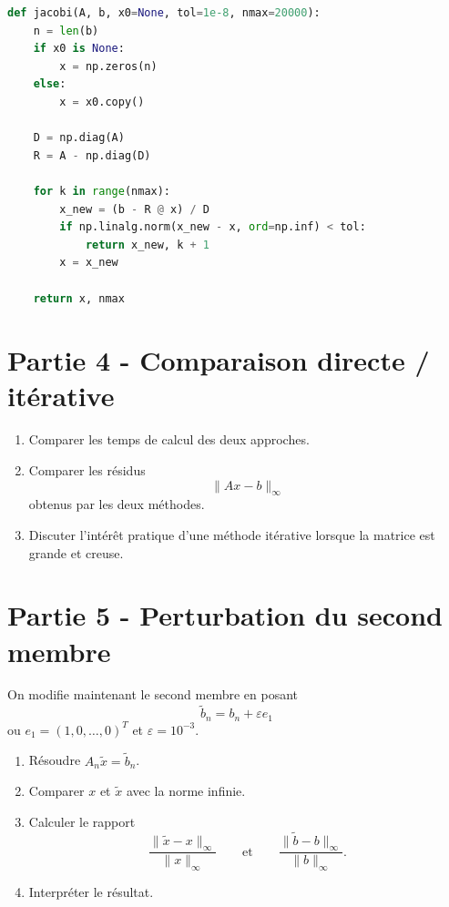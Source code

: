 \begin{lstlisting}[language=Python]
def jacobi(A, b, x0=None, tol=1e-8, nmax=20000):
    n = len(b)
    if x0 is None:
        x = np.zeros(n)
    else:
        x = x0.copy()

    D = np.diag(A)
    R = A - np.diag(D)

    for k in range(nmax):
        x_new = (b - R @ x) / D
        if np.linalg.norm(x_new - x, ord=np.inf) < tol:
            return x_new, k + 1
        x = x_new

    return x, nmax
\end{lstlisting}

\section*{Partie 4 - Comparaison directe / itérative}
\begin{enumerate}
    \item Comparer les temps de calcul des deux approches.

    \item Comparer les résidus
    \[
    \|Ax-b\|_{\infty}
    \]
    obtenus par les deux méthodes.

    \item Discuter l'intérêt pratique d'une méthode itérative lorsque la matrice est grande et creuse.
\end{enumerate}

\section*{Partie 5 - Perturbation du second membre}
On modifie maintenant le second membre en posant
\[
\tilde b_n=b_n+\varepsilon e_1
\]
ou $e_1=(1,0,\dots,0)^T$ et $\varepsilon=10^{-3}$.

\begin{enumerate}
    \item Résoudre $A_n\tilde x=\tilde b_n$.

    \item Comparer $x$ et $\tilde x$ avec la norme infinie.

    \item Calculer le rapport
    \[
    \frac{\|\tilde x-x\|_{\infty}}{\|x\|_{\infty}}
    \qquad \text{et} \qquad
    \frac{\|\tilde b-b\|_{\infty}}{\|b\|_{\infty}}.
    \]

    \item Interpréter le résultat.
\end{enumerate}

